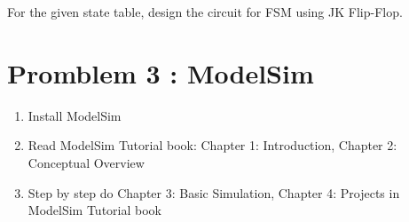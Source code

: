 \documentclass{article}
\begin{document}
For the given state table, design the circuit for FSM using JK Flip-Flop.

\section*{Promblem 3 : ModelSim}

\begin{enumerate}
    \item Install ModelSim
    \item Read ModelSim Tutorial book: Chapter 1: Introduction, Chapter 2: Conceptual Overview
    \item Step by step do Chapter 3: Basic Simulation, Chapter 4: Projects in ModelSim Tutorial book
\end{enumerate}
\end{document}
